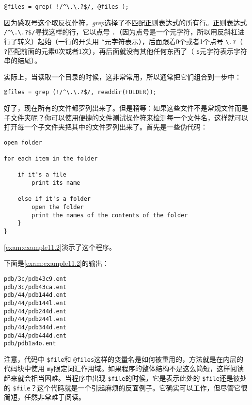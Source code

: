 \begin{lstlisting}
@files = grep( !/^\.\.?$/, @files );
\end{lstlisting}

因为感叹号这个取反操作符，\textit{grep}选择了不匹配正则表达式的所有行。正则表达式 \verb|/^\.\.?$/|寻找这样的行，它以点号 \verb|.|（因为点号是一个元字符，所以用反斜杠进行了转义）起始（一行的开头用 \verb|^|元字符表示），后面跟着0个或者1个点号 \verb|\.?|（ \verb|?|匹配前面的元素0次或者1次），再后面就没有其他任何东西了（ \verb|$|元字符表示字符串的结尾）。

实际上，当读取一个目录的时候，这非常常用，所以通常把它们组合到一步中：

\begin{lstlisting}
@files = grep (!/^\.\.?$/, readdir(FOLDER));
\end{lstlisting}

好了，现在所有的文件都罗列出来了。但是稍等：如果这些文件不是常规文件而是子文件夹呢？你可以使用便捷的文件测试操作符来检测每一个文件名，这样就可以打开每一个子文件夹把其中的文件罗列出来了。首先是一些伪代码：

\begin{lstlisting}
open folder

for each item in the folder

    if it's a file
        print its name

    else if it's a folder
        open the folder
        print the names of the contents of the folder
    }
}
\end{lstlisting}

\autoref{exam:example11.2}演示了这个程序。



下面是\autoref{exam:example11.2}的输出：

\begin{lstlisting}
pdb/3c/pdb43c9.ent
pdb/3c/pdb43ca.ent
pdb/44/pdb144d.ent
pdb/44/pdb144l.ent
pdb/44/pdb244d.ent
pdb/44/pdb244l.ent
pdb/44/pdb344d.ent
pdb/44/pdb444d.ent
pdb/pdb1a4o.ent
\end{lstlisting}

注意，代码中 \verb|$file|和 \verb|@files|这样的变量名是如何被重用的，方法就是在内层的代码块中使用 \verb|my|限定词汇作用域。如果程序的整体结构不是这么简短，这样阅读起来就会相当困难。当程序中出现 \verb|$file|的时候，它是表示此处的 \verb|$file|还是彼处的 \verb|$file|？这个代码就是一个引起麻烦的反面例子。它确实可以工作，但尽管它很简短，任然非常难于阅读。

